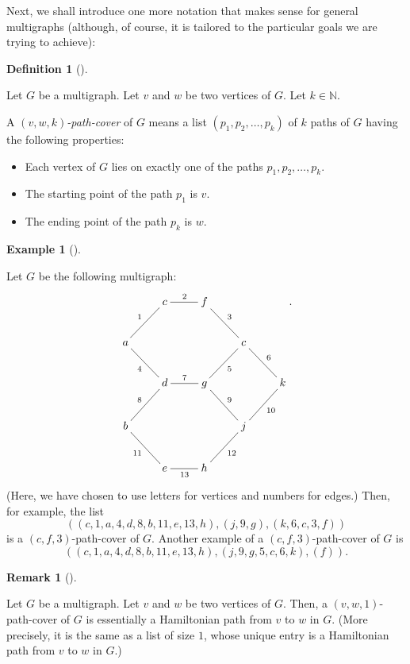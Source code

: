 \documentclass[numbers=enddot,12pt,final,onecolumn,notitlepage]{scrartcl}%
\makeatletter
\theoremstyle{definition}
\newtheorem{defi}[theo]{Definition}
\newenvironment{definition}[1][]
{\begin{defi}[#1]\begin{leftbar}}
{\end{leftbar}\end{defi}}
\newtheorem{remk}[theo]{Remark}
\newenvironment{remark}[1][]
{\begin{remk}[#1]\begin{leftbar}}
{\end{leftbar}\end{remk}}
\newtheorem{exam}[theo]{Example}
\newenvironment{example}[1][]
{\begin{exam}[#1]\begin{leftbar}}
{\end{leftbar}\end{exam}}
\newenvironment{noncompile}{}{}
\newcommand{\NN}{\mathbb{N}}
\newcommand{\tup}[1]{\left( #1 \right)}
\newcommand{\are}{\ar@{-}}
\makeatother
\begin{document}
\begin{noncompile}
Next, we shall introduce one more notation that makes sense for
general multigraphs (although, of course, it is tailored to
the particular goals we are trying to achieve):

\begin{definition}
Let $G$ be a multigraph.
Let $v$ and $w$ be two vertices of $G$.
Let $k \in \NN$.

A \textit{$\tup{v, w, k}$-path-cover} of $G$ means a list
$\tup{p_1, p_2, \ldots, p_k}$ of $k$ paths of $G$ having the
following properties:
\begin{itemize}
 \item Each vertex of $G$ lies on exactly one of the paths
       $p_1, p_2, \ldots, p_k$.
 \item The starting point of the path $p_1$ is $v$.
 \item The ending point of the path $p_k$ is $w$.
\end{itemize}

\end{definition}

\begin{example}
Let $G$ be the following multigraph:
\[
 \xymatrix{
  & c \are[dl]_1 \are[r]^2 & f \are[dr]^3 \\
  a \are[dr]_4 & & & c \are[dl]^5 \are[dr]^6 \\
  & d \are[r]^7 \are[dl]_8 & g \are[dr]^9 & & k \are[dl]^{10} \\
  b \are[dr]_{11} & & & j \are[dl]^{12} \\
  & e \are[r]_{13} & h
 } .
\]
(Here, we have chosen to use letters for vertices and numbers for
edges.)
Then, for example, the list
\[
 \tup{ \tup{c, 1, a, 4, d, 8, b, 11, e, 13, h},
       \tup{j, 9, g},
       \tup{k, 6, c, 3, f} }
\]
is a $\tup{c, f, 3}$-path-cover of $G$.
Another example of a $\tup{c, f, 3}$-path-cover of $G$ is
\[
 \tup{ \tup{c, 1, a, 4, d, 8, b, 11, e, 13, h},
       \tup{j, 9, g, 5, c, 6, k},
       \tup{f} } .
\]
\end{example}

\begin{remark}
Let $G$ be a multigraph.
Let $v$ and $w$ be two vertices of $G$.
Then, a $\tup{v, w, 1}$-path-cover of $G$ is essentially a
Hamiltonian path from $v$ to $w$ in $G$.
(More precisely, it is the same as a list of size $1$,
whose unique entry is a Hamiltonian path from $v$ to $w$ in $G$.)
\end{remark}
\end{noncompile}
\end{document}
